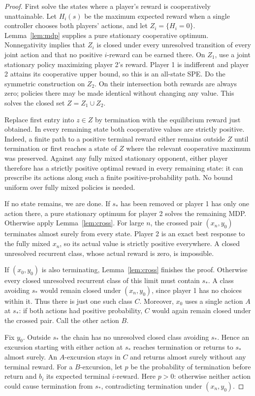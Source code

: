 \documentclass[11pt]{article}
\begin{document}
\begin{proof}
First solve the states where a player's reward is cooperatively
unattainable. Let $H_i(s)$ be the maximum expected reward when a single
controller chooses both players' actions, and let $Z_i=\{H_i=0\}$.
Lemma~\ref{lem:mdp} supplies a pure stationary cooperative optimum.
Nonnegativity implies that $Z_i$ is closed under every unresolved
transition of every joint action and that no positive $i$-reward can
be earned there. On $Z_1$, use a joint stationary policy maximizing
player 2's reward. Player 1 is indifferent and player 2 attains its
cooperative upper bound, so this is an all-state SPE. Do the symmetric
construction on $Z_2$. On their intersection both rewards are always
zero; policies there may be made identical without changing any value.
This solves the closed set $Z=Z_1\cup Z_2$.

Replace first entry into $z\in Z$ by termination with the equilibrium
reward just obtained. In every remaining state both cooperative values
are strictly positive. Indeed, a finite path to a positive terminal
reward either remains outside $Z$ until termination or first reaches a
state of $Z$ where the relevant cooperative maximum was preserved.
Against any fully mixed stationary opponent, either player therefore
has a strictly positive optimal reward in every remaining state: it
can prescribe its actions along such a finite positive-probability path.
No bound uniform over fully mixed policies is needed.

If no state remains, we are done. If $s_*$ has been removed or player 1
has only one action there, a pure stationary optimum for player 2 solves
the remaining MDP. Otherwise apply Lemma~\ref{lem:cross}. For large $n$,
the crossed pair $(x_n,y_0)$ terminates almost surely from every state.
Player 2 is an exact best response to the fully mixed $x_n$, so its
actual value is strictly positive everywhere. A closed unresolved
recurrent class, whose actual reward is zero, is impossible.

If $(x_0,y_0)$ is also terminating, Lemma~\ref{lem:cross} finishes the
proof. Otherwise every closed unresolved recurrent class of this limit
must contain $s_*$. A class avoiding $s_*$ would remain closed under
$(x_n,y_0)$, since player 1 has no choices within it. Thus there is just
one such class $C$. Moreover, $x_0$ uses a single action $A$ at $s_*$:
if both actions had positive probability, $C$ would again remain closed
under the crossed pair. Call the other action $B$.

Fix $y_0$. Outside $s_*$ the chain has no unresolved closed class
avoiding $s_*$. Hence an excursion starting with either action at
$s_*$ reaches termination or returns to $s_*$ almost surely.
An $A$-excursion stays in $C$ and returns almost surely without any
terminal reward. For a $B$-excursion, let $p$ be the probability of
termination before return and $b_i$ its expected terminal $i$-reward.
Here $p>0$: otherwise neither action could cause termination from
$s_*$, contradicting termination under $(x_n,y_0)$.


\end{proof}
\end{document}
